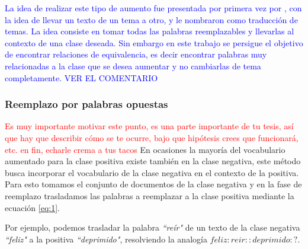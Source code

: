\textcolor{blue}{La idea de realizar este tipo de aumento fue presentada por primera vez por \cite{zhang2019integrating}, con la idea de llevar un texto de un tema a otro, y le nombraron como traducción de temas. La idea consiste en tomar todas las palabras reemplazables y llevarlas al contexto de una clase deseada. Sin embargo en este trabajo se persigue el objetivo de encontrar relaciones de equivalencia, es decir encontrar palabras muy relacionadas a la clase que se desea aumentar y no cambiarlas de tema completamente. VER EL COMENTARIO}



\subsubsection{Reemplazo por palabras opuestas}

\textcolor{red}{Es muy importante motivar este punto, es una parte importante de tu tesis, así que hay que describir cómo se te ocurre, bajo que hipótesis crees que funcionará, etc. en fin, echarle crema a tus tacos} 
En ocasiones la mayoría  del vocabulario aumentado para la clase positiva existe también en la clase negativa, este método busca incorporar el vocabulario de la clase negativa en el contexto de la positiva. Para esto tomamos el conjunto de documentos de la clase negativa y en la fase de reemplazo trasladamos las palabras a reemplazar a la clase positiva mediante la ecuación \ref{eq:1}.

Por ejemplo, podemos trasladar la palabra \textit{``reír"} de un texto de la clase negativa \textit{``feliz"} a la positiva \textit{``deprimido"}, resolviendo la analogía $feliz:reir::deprimido:?$.



